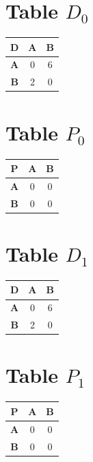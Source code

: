 \documentclass{article}
\begin{document}
\section{Table $D_{0}$}
\begin{center}
    \begin{tabular}{|c||c|c|}
        \hline
        \textbf{D} & \textbf{A} & \textbf{B} \\
        \hline
        \hline
        \textbf{A}& 0 & 6 \\
        \hline
        \textbf{B}& 2 & 0 \\
        \hline
    \end{tabular}
\end{center}


\section{Table $P_{0}$}
\begin{center}
    \begin{tabular}{|c||c|c|}
        \hline
        \textbf{P} & \textbf{A} & \textbf{B} \\
        \hline
        \hline
        \textbf{A}& 0 & 0 \\
        \hline
        \textbf{B}& 0 & 0 \\
        \hline
    \end{tabular}
\end{center}


\section{Table $D_{1}$}
\begin{center}
    \begin{tabular}{|c||c|c|}
        \hline
        \textbf{D} & \textbf{A} & \textbf{B} \\
        \hline
        \hline
        \textbf{A}& 0 & 6 \\
        \hline
        \textbf{B}& 2 & 0 \\
        \hline
    \end{tabular}
\end{center}


\section{Table $P_{1}$}
\begin{center}
    \begin{tabular}{|c||c|c|}
        \hline
        \textbf{P} & \textbf{A} & \textbf{B} \\
        \hline
        \hline
        \textbf{A}& 0 & 0 \\
        \hline
        \textbf{B}& 0 & 0 \\
        \hline
    \end{tabular}
\end{center}
\end{document}
